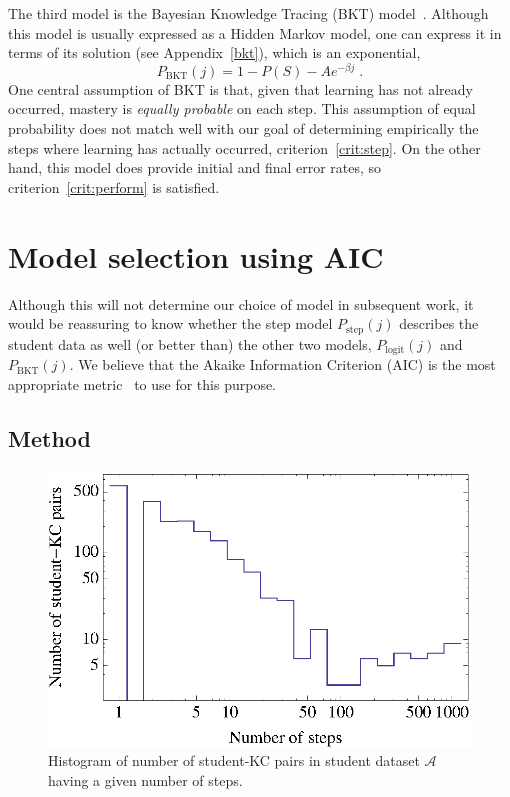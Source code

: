\documentclass[11pt,letterpaper]{article}
\begin{document}
The third model is the Bayesian Knowledge Tracing (BKT) model~\cite{anderson}.
Although this model is usually expressed as a Hidden Markov model, 
one can express it in terms of its solution (see Appendix~\ref{bkt}),
which is an exponential,
%
\begin{equation}
         P_\mathrm{BKT}(j) = 1-P(S) -A e^{-\beta j} \; .
\end{equation}
%
One central assumption of BKT is that, given that learning
has not already occurred, mastery is {\em equally probable} on each step.
This assumption of equal probability does not match well with 
our goal of determining empirically the steps where learning has 
actually occurred, criterion~\ref{crit:step}.
On the other hand, this model does provide initial and final
error rates, so criterion~\ref{crit:perform} is satisfied. 

\section{Model selection using AIC}
\label{model-selection}

Although this will not determine our choice of model in subsequent
work, it would be reassuring to know whether the step model 
$P_\mathrm{step}(j)$
describes the student data as well (or better than) the
other two models, $P_\mathrm{logit}(j)$ and $P_\mathrm{BKT}(j)$.  
We believe that the Akaike Information 
Criterion (AIC) is the most appropriate metric~\cite{akaike,aicbook}
to use for this purpose.

\subsection{Method}


\begin{figure}
  \centering \includegraphics{student-kc-length-histogram.eps}
  \caption{Histogram of number of student-KC pairs in student 
    dataset $\mathcal{A}$ having a given number of steps.}
    \label{student-length-histogram}
\end{figure}
\end{document}
